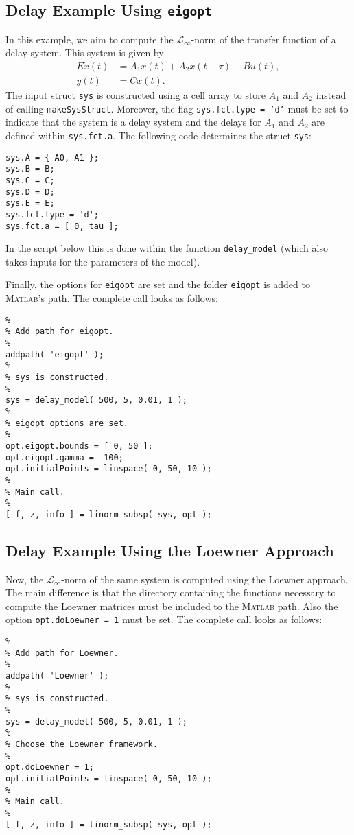 \documentclass[10pt,a4paper]{article}
\begin{document}
\subsection{Delay Example Using \texttt{eigopt}}
In this example, we aim to compute the $\mathcal{L}_\infty$-norm of the transfer function of a delay system. This system is given by
\begin{align*}
E\dot{x}(t) &= A_1x(t) + A_2x(t-\tau) + Bu(t), \\
       y(t) &= Cx(t).
\end{align*}
The input struct \texttt{sys} is constructed using a cell array to store $A_1$ and $A_2$ instead of calling \texttt{makeSysStruct}. Moreover, the flag \texttt{sys.fct.type = 'd'} must be set to indicate that the system is a delay system and the delays for $A_1$ and $A_2$ are defined within \texttt{sys.fct.a}. The following code determines the struct \texttt{sys}:
\begin{verbatim}
sys.A = { A0, A1 };
sys.B = B;
sys.C = C;
sys.D = D;
sys.E = E;
sys.fct.type = 'd';
sys.fct.a = [ 0, tau ];
\end{verbatim}
In the script below this is done within the function \texttt{delay\_model} (which also takes inputs for the parameters of the model). 

Finally, the options for \texttt{eigopt} are set and the folder \texttt{eigopt} is added to \textsc{Matlab}'s path. The complete call looks as follows:
\begin{verbatim}
%
% Add path for eigopt.
%
addpath( 'eigopt' );
%
% sys is constructed.
%
sys = delay_model( 500, 5, 0.01, 1 );
%
% eigopt options are set.
%
opt.eigopt.bounds = [ 0, 50 ];
opt.eigopt.gamma = -100;
opt.initialPoints = linspace( 0, 50, 10 );
%
% Main call.
%
[ f, z, info ] = linorm_subsp( sys, opt );
\end{verbatim}

\subsection{Delay Example Using the Loewner Approach}
Now, the $\mathcal{L}_{\infty}$-norm of the same system is computed using the Loewner approach. The main difference is that the directory containing the functions necessary to compute the Loewner matrices must be included to the \textsc{Matlab} path. Also the option \texttt{opt.doLoewner = 1} must be set. The complete call looks as follows:
\begin{verbatim}
%
% Add path for Loewner.
%
addpath( 'Loewner' );
%
% sys is constructed.
%
sys = delay_model( 500, 5, 0.01, 1 );
%
% Choose the Loewner framework.
%
opt.doLoewner = 1;
opt.initialPoints = linspace( 0, 50, 10 );
%
% Main call.
%
[ f, z, info ] = linorm_subsp( sys, opt );
\end{verbatim} 



\end{document}
